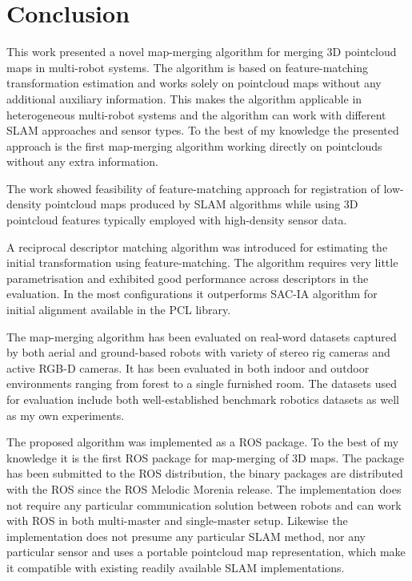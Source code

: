 \chapter*{Conclusion}

This work presented a novel map-merging algorithm for merging \gls{3D} pointcloud maps in multi-robot systems. The algorithm is based on feature-matching transformation estimation and works solely on pointcloud maps without any additional auxiliary information. This makes the algorithm applicable in heterogeneous multi-robot systems and the algorithm can work with different \gls{SLAM} approaches and sensor types. To the best of my knowledge the presented approach is the first map-merging algorithm working directly on pointclouds without any extra information.

The work showed feasibility of feature-matching approach for registration of low-density pointcloud maps produced by \gls{SLAM} algorithms while using \gls{3D} pointcloud features typically employed with high-density sensor data.

A reciprocal descriptor matching algorithm was introduced for estimating the initial transformation using feature-matching. The algorithm requires very little parametrisation and exhibited good performance across descriptors in the evaluation. In the most configurations it outperforms \gls{SAC-IA} algorithm for initial alignment available in the \gls{PCL} library.

The map-merging algorithm has been evaluated on real-word datasets captured by both aerial and ground-based robots with variety of stereo rig cameras and active \gls{RGB-D} cameras. It has been evaluated in both indoor and outdoor environments ranging from forest to a single furnished room. The datasets used for evaluation include both well-established benchmark robotics datasets as well as my own experiments.

The proposed algorithm was implemented as a \gls{ROS} package. To the best of my knowledge it is the first \gls{ROS} package for map-merging of \gls{3D} maps. The package has been submitted to the \gls{ROS} distribution, the binary packages are distributed with the \gls{ROS} since the \gls{ROS} Melodic Morenia release. The implementation does not require any particular communication solution between robots and can work with \gls{ROS} in both multi-master and single-master setup. Likewise the implementation does not presume any particular \gls{SLAM} method, nor any particular sensor and uses a portable pointcloud map representation, which make it compatible with existing readily available \gls{SLAM} implementations.

